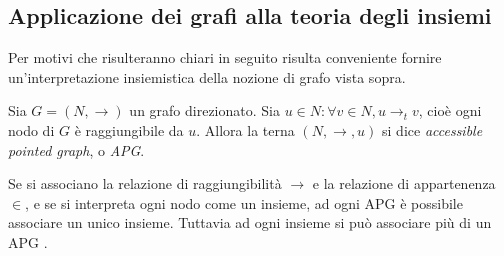 \subsection{Applicazione dei grafi alla teoria degli insiemi}
\label{sec:graphs_sets}
Per motivi che risulteranno chiari in seguito risulta conveniente fornire un'interpretazione insiemistica della nozione di grafo vista sopra.
\begin{definition}
    Sia $G = (N, \to)$ un grafo direzionato. Sia $u \in N : \forall v \in N, u \to_t v$, cioè ogni nodo di $G$ è raggiungibile da $u$. Allora la terna $(N, \to, u)$ si dice \textit{accessible pointed graph}, o \textit{APG}.
\end{definition}
Se si associano la relazione di raggiungibilità $\to$ e la relazione di appartenenza $\in$, e se si interpreta ogni nodo come un insieme, ad ogni APG è possibile associare un unico insieme. Tuttavia ad ogni insieme si può associare più di un APG \cite{dovier}.
